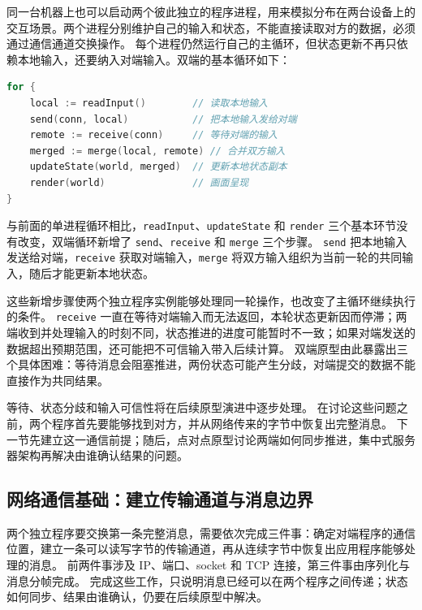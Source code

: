 同一台机器上也可以启动两个彼此独立的程序进程，用来模拟分布在两台设备上的交互场景。两个进程分别维护自己的输入和状态，不能直接读取对方的数据，必须通过通信通道交换操作。
每个进程仍然运行自己的主循环，但状态更新不再只依赖本地输入，还要纳入对端输入。双端的基本循环如下：


\begin{tcolorbox}[title=双进程交互循环（概念示例）]
\begin{lstlisting}[style=codeblock, language=go]
for {
    local := readInput()        // 读取本地输入
    send(conn, local)           // 把本地输入发给对端
    remote := receive(conn)     // 等待对端的输入
    merged := merge(local, remote) // 合并双方输入
    updateState(world, merged)  // 更新本地状态副本
    render(world)               // 画面呈现
}
\end{lstlisting}
\end{tcolorbox}

与前面的单进程循环相比，\texttt{readInput}、\texttt{updateState} 和 \texttt{render} 三个基本环节没有改变，双端循环新增了 \texttt{send}、\texttt{receive} 和 \texttt{merge} 三个步骤。
\texttt{send} 把本地输入发送给对端，\texttt{receive} 获取对端输入，\texttt{merge} 将双方输入组织为当前一轮的共同输入，随后才能更新本地状态。

这些新增步骤使两个独立程序实例能够处理同一轮操作，也改变了主循环继续执行的条件。
\texttt{receive} 一直在等待对端输入而无法返回，本轮状态更新因而停滞；两端收到并处理输入的时刻不同，状态推进的进度可能暂时不一致；如果对端发送的数据超出预期范围，还可能把不可信输入带入后续计算。
双端原型由此暴露出三个具体困难：等待消息会阻塞推进，两份状态可能产生分歧，对端提交的数据不能直接作为共同结果。

等待、状态分歧和输入可信性将在后续原型演进中逐步处理。
在讨论这些问题之前，两个程序首先要能够找到对方，并从网络传来的字节中恢复出完整消息。
下一节先建立这一通信前提；随后，点对点原型讨论两端如何同步推进，集中式服务器架构再解决由谁确认结果的问题。

\subsection{网络通信基础：建立传输通道与消息边界}\label{sec2:network-communication-basics}

两个独立程序要交换第一条完整消息，需要依次完成三件事：确定对端程序的通信位置，建立一条可以读写字节的传输通道，再从连续字节中恢复出应用程序能够处理的消息。
前两件事涉及 IP、端口、socket 和 TCP 连接，第三件事由序列化与消息分帧完成。
完成这些工作，只说明消息已经可以在两个程序之间传递；状态如何同步、结果由谁确认，仍要在后续原型中解决。

